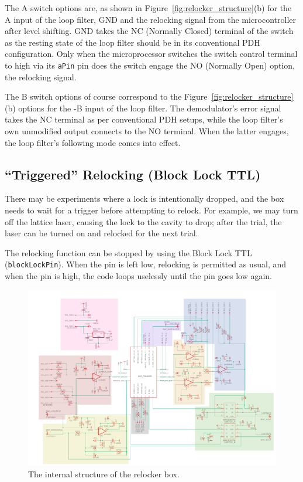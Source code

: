\documentclass[10pt]{report}
\newcommand{\aPin}[0] {\texttt{aPin}}
\newcommand{\blockLockPin}[0] {\texttt{blockLockPin}}
\begin{document}
The A switch options are, as shown in Figure~\ref{fig:relocker_structure}(b) for the A input of the loop filter, GND and the relocking signal from the microcontroller after level shifting. GND takes the NC (Normally Closed) terminal of the switch as the resting state of the loop filter should be in its conventional PDH configuration. Only when the microprocessor switches the switch control terminal to high via its \aPin{} pin does the switch engage the NO (Normally Open) option, the relocking signal.

The B switch options of course correspond to the Figure~\ref{fig:relocker_structure}(b) options for the -B input of the loop filter. The demodulator's error signal takes the NC terminal as per conventional PDH setups, while the loop filter's own unmodified output connects to the NO terminal. When the latter engages, the loop filter's following mode comes into effect. 


\subsection{``Triggered'' Relocking (Block Lock TTL)}\label{subsec:blockLock}
There may be experiments where a lock is intentionally dropped, and the box needs to wait for a trigger before attempting to relock. For example, we may turn off the lattice laser, causing the lock to the cavity to drop; after the trial, the laser can be turned on and relocked for the next trial.

The relocking function can be stopped by using the Block Lock TTL (\blockLockPin{}). When the pin is left low, relocking is permitted as usual, and when the pin is high, the code loops uselessly until the pin goes low again.

\begin{figure}[h]
    \centering
    \includegraphics[width=1.0\textwidth,angle=90]{includes/relocker_pcb_schematic_colored.pdf}
    \caption{The internal structure of the relocker box.}
    \label{fig:relockerIntStructure}
\end{figure}
\end{document}
